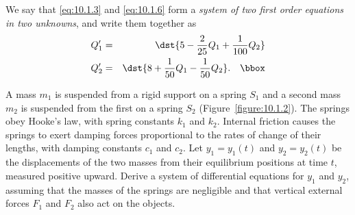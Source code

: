 \begin{examplesolution}
We say that \eqref{eq:10.1.3} and \eqref{eq:10.1.6} form a {\relax\it system of two first
order equations in two unknowns\/}, and write them together as
\begin{eqnarray*}
  Q_{1}' & = & \dst{5-\frac{2}{25}Q_{1}+\frac{1}{100}Q_{2}} \\
  Q_{2}' & = & \dst{8+\frac{1}{50}Q_{1}-\frac{1}{50}Q_{2}}.\quad\bbox
\end{eqnarray*}
\end{examplesolution}

\setcounter{example}{1}
\begin{example}
  \label{example:10.1.2} \rm A mass $m_{1}$ is suspended from a rigid support on a spring $S_{1}$
  and a second mass $m_{2}$ is suspended from the first on a spring $S_{2}$
  (Figure~\ref{figure:10.1.2}). The springs obey Hooke's law, with spring constants $k_{1}$ and
  $k_{2}$. Internal friction causes the springs to exert damping forces proportional to the rates of
  change of their lengths, with damping constants $c_{1}$ and $c_{2}$. Let $y_{1}=y_{1}(t)$ and
  $y_{2}=y_{2}(t)$ be the displacements of the two masses from their equilibrium positions at time
  $t$, measured positive upward. Derive a system of differential equations for $y_{1}$ and $y_{2}$,
  assuming that the masses of the springs are negligible and that vertical external forces $F_{1}$
  and $F_{2}$ also act on the objects.
\end{example}
\setcounter{equation}{6}
\setcounter{figure}{1}
